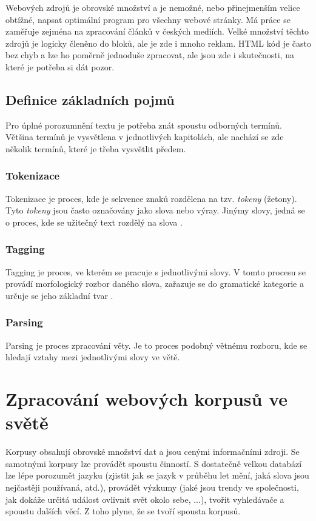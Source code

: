 Webových zdrojů je obrovské množství a je nemožné, nebo přinejmenším velice obtížné, napsat optimální program
pro všechny webové stránky. Má práce se zaměřuje zejména na zpracování článků v českých mediích. Velké množství těchto zdrojů
je logicky členěno do bloků, ale je zde i mnoho reklam. HTML kód je často bez chyb a lze ho poměrně jednoduše
zpracovat, ale jsou zde i skutečnosti, na které je potřeba si dát pozor.

\section{Definice základních pojmů}
Pro úplné porozumnění textu je potřeba znát spoustu odborných termínů. Většina termínů je vysvětlena
v jednotlivých kapitolách, ale nachází se zde několik termínů, které je třeba vysvětlit předem.

\subsection{Tokenizace}
\label{Tokenizace}
Tokenizace je proces, kde je sekvence znaků rozdělena na tzv. \textit{tokeny} (žetony). Tyto \textit{tokeny} jsou
často označovány jako slova nebo výray. Jinýmy slovy, jedná se o proces, kde se užitečný text rozdělý na slova \cite{TOKENIZACE}.

\subsection{Tagging}
\label{Tagging}
Tagging je proces, ve kterém se pracuje s jednotlivými slovy. V tomto procesu se provádí morfologický rozbor daného slova,
zařazuje se do gramatické kategorie a určuje se jeho základní tvar \cite{TAGGING}.

\subsection{Parsing}
\label{Parsing}
Parsing je proces zpracování věty. Je to proces podobný větnému rozboru, kde se hledají vztahy mezi jednotlivými slovy
ve větě.

\chapter{Zpracování webových korpusů ve světě}
Korpusy obsahují obrovské množství dat a jsou cenými informačními zdroji. Se samotnými korpusy
lze provádět spoustu činností. S dostatečně velkou databází lze lépe porozumět jazyku
(zjistit jak se jazyk v průběhu let mění, jaká slova jsou nejčastěji používaná, atd.),
provádět výzkumy (jaké jsou trendy ve společnosti, jak dokáže určitá událost ovlivnit svět okolo sebe, ...),
tvořit vyhledávače a spoustu dalších věcí. Z toho plyne, že se tvoří spousta korpusů.

